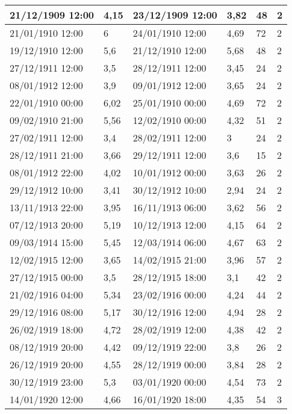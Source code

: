 \begin{longtable}{|p{3cm}|p{2.1cm}|p{3cm}|p{2cm}|l|l|}
        21/12/1909 12:00 & 4,15 & 23/12/1909 12:00 & 3,82 & 48 & 2 \\ \hline
        21/01/1910 12:00 & 6 & 24/01/1910 12:00 & 4,69 & 72 & 2 \\ \hline
        19/12/1910 12:00 & 5,6 & 21/12/1910 12:00 & 5,68 & 48 & 2 \\ \hline
        27/12/1911 12:00 & 3,5 & 28/12/1911 12:00 & 3,45 & 24 & 2 \\ \hline
        08/01/1912 12:00 & 3,9 & 09/01/1912 12:00 & 3,65 & 24 & 2 \\ \hline
        22/01/1910 00:00 & 6,02 & 25/01/1910 00:00 & 4,69 & 72 & 2 \\ \hline
        09/02/1910 21:00 & 5,56 & 12/02/1910 00:00 & 4,32 & 51 & 2 \\ \hline
        27/02/1911 12:00 & 3,4 & 28/02/1911 12:00 & 3 & 24 & 2 \\ \hline
        28/12/1911 21:00 & 3,66 & 29/12/1911 12:00 & 3,6 & 15 & 2 \\ \hline
        08/01/1912 22:00 & 4,02 & 10/01/1912 00:00 & 3,63 & 26 & 2 \\ \hline
        29/12/1912 10:00 & 3,41 & 30/12/1912 10:00 & 2,94 & 24 & 2 \\ \hline
        13/11/1913 22:00 & 3,95 & 16/11/1913 06:00 & 3,62 & 56 & 2 \\ \hline
        07/12/1913 20:00 & 5,19 & 10/12/1913 12:00 & 4,15 & 64 & 2 \\ \hline
        09/03/1914 15:00 & 5,45 & 12/03/1914 06:00 & 4,67 & 63 & 2 \\ \hline
        12/02/1915 12:00 & 3,65 & 14/02/1915 21:00 & 3,96 & 57 & 2 \\ \hline
        27/12/1915 00:00 & 3,5 & 28/12/1915 18:00 & 3,1 & 42 & 2 \\ \hline
        21/02/1916 04:00 & 5,34 & 23/02/1916 00:00 & 4,24 & 44 & 2 \\ \hline
        29/12/1916 08:00 & 5,17 & 30/12/1916 12:00 & 4,94 & 28 & 2 \\ \hline
        26/02/1919 18:00 & 4,72 & 28/02/1919 12:00 & 4,38 & 42 & 2 \\ \hline
        08/12/1919 20:00 & 4,42 & 09/12/1919 22:00 & 3,8 & 26 & 2 \\ \hline
        26/12/1919 20:00 & 4,55 & 28/12/1919 00:00 & 3,84 & 28 & 2 \\ \hline
        30/12/1919 23:00 & 5,3 & 03/01/1920 00:00 & 4,54 & 73 & 2 \\ \hline
        14/01/1920 12:00 & 4,66 & 16/01/1920 18:00 & 4,35 & 54 & 3 \\ \hline

\end{longtable}

